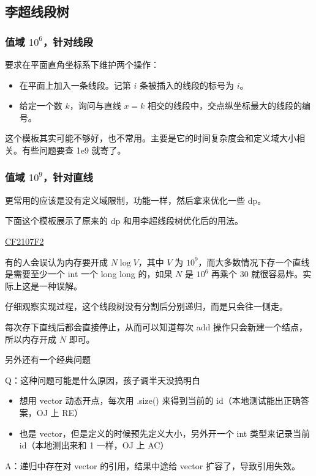 \subsection{李超线段树}

\subsubsection{值域 $10^6$，针对线段}

要求在平面直角坐标系下维护两个操作：

\begin{itemize}
    \item 在平面上加入一条线段。记第 $i$ 条被插入的线段的标号为 $i$。
    \item 给定一个数 $k$，询问与直线 $x = k$ 相交的线段中，交点纵坐标最大的线段的编号。
\end{itemize}



这个模板其实可能不够好，也不常用。主要是它的时间复杂度会和定义域大小相关。有些问题要查 1e9 就寄了。

\subsubsection{值域 $10^9$，针对直线}

更常用的应该是没有定义域限制，功能一样，然后拿来优化一些 dp。

下面这个模板展示了原来的 dp 和用李超线段树优化后的用法。

\href{https://codeforces.com/contest/2107/problem/F2}{CF2107F2}



有的人会误认为内存要开成 $N\log V$，其中 $V$ 为 $10^9$，而大多数情况下存一个直线是需要至少一个 int 一个 long long 的，如果 $N$ 是 $10^6$ 再乘个 30 就很容易炸。实际上这是一种误解。

仔细观察实现过程，这个线段树没有分割后分别递归，而是只会往一侧走。

每次存下直线后都会直接停止，从而可以知道每次 add 操作只会新建一个结点，所以内存开成 $N$ 即可。

另外还有一个经典问题

Q：这种问题可能是什么原因，孩子调半天没搞明白

\begin{itemize}
    
\item 想用 vector 动态开点，每次用 .size() 来得到当前的 id（本地测试能出正确答案，OJ 上 RE）

\item 也是 vector，但是定义的时候预先定义大小，另外开一个 int 类型来记录当前 id（本地测出来和 1 一样，OJ 上 AC）

\end{itemize}

A：递归中存在对 vector 的引用，结果中途给 vector 扩容了，导致引用失效。
